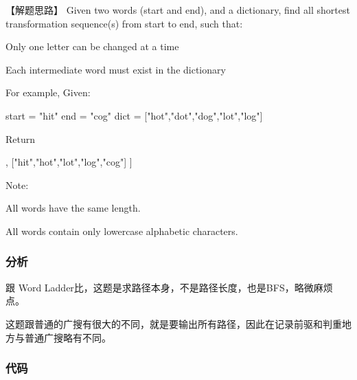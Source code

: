 【解题思路】
Given two words (start and end), and a dictionary, find all shortest transformation sequence(s) from start to end, such that:
\begindot
\item Only one letter can be changed at a time
\item Each intermediate word must exist in the dictionary
\myenddot

For example, Given:
\begin{Code}
	start = "hit"
	end = "cog"
	dict = ["hot","dot","dog","lot","log"]
\end{Code}
Return
\begin{Code}
	[
	["hit","hot","dot","dog","cog"],
	["hit","hot","lot","log","cog"]
	]
\end{Code}

Note:
\begindot
\item All words have the same length.
\item All words contain only lowercase alphabetic characters.
\myenddot


\subsubsection{分析}
跟 Word Ladder比，这题是求路径本身，不是路径长度，也是BFS，略微麻烦点。

这题跟普通的广搜有很大的不同，就是要输出所有路径，因此在记录前驱和判重地方与普通广搜略有不同。


\subsubsection{代码}

